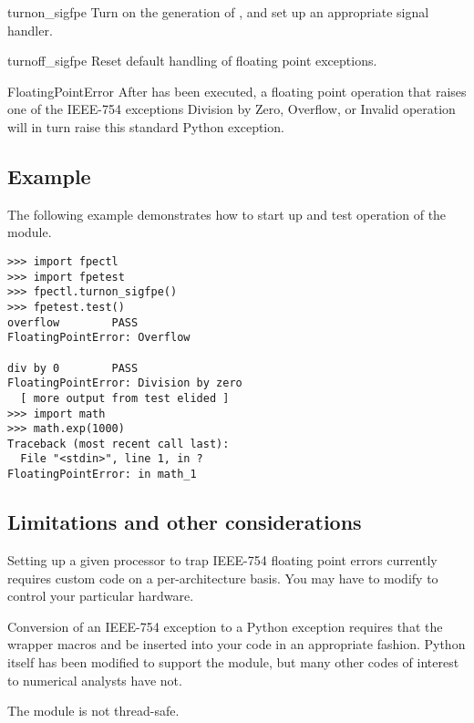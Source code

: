 \begin{funcdesc}{turnon_sigfpe}{}
Turn on the generation of ,
and set up an appropriate signal handler.
\end{funcdesc}

\begin{funcdesc}{turnoff_sigfpe}{}
Reset default handling of floating point exceptions.
\end{funcdesc}

\begin{excdesc}{FloatingPointError}
After  has been executed,
a floating point operation that raises one of the
IEEE-754 exceptions
Division by Zero, Overflow, or Invalid operation
will in turn raise this standard Python exception.
\end{excdesc}


\subsection{Example \label{fpectl-example}}

The following example demonstrates how to start up and test operation of
the  module.

\begin{verbatim}
>>> import fpectl
>>> import fpetest
>>> fpectl.turnon_sigfpe()
>>> fpetest.test()
overflow        PASS
FloatingPointError: Overflow

div by 0        PASS
FloatingPointError: Division by zero
  [ more output from test elided ]
>>> import math
>>> math.exp(1000)
Traceback (most recent call last):
  File "<stdin>", line 1, in ?
FloatingPointError: in math_1
\end{verbatim}


\subsection{Limitations and other considerations \label{fpectl-limitations}}

Setting up a given processor to trap IEEE-754 floating point
errors currently requires custom code on a per-architecture basis.
You may have to modify  to control your particular hardware.

Conversion of an IEEE-754 exception to a Python exception requires
that the wrapper macros  and
 be inserted into your code in an appropriate
fashion.  Python itself has been modified to support the
 module, but many other codes of interest to numerical
analysts have not.

The  module is not thread-safe.

\begin{seealso}
\end{seealso}
